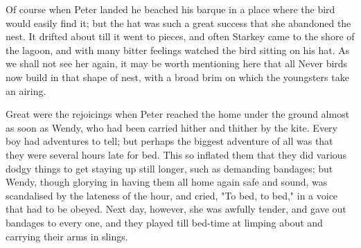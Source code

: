 Of course when Peter landed he beached his barque in a place where the bird would easily find it;
but the hat was such a great success that she abandoned the nest.
It drifted about till it went to pieces,
and often Starkey came to the shore of the lagoon,
and with many bitter feelings watched the bird sitting on his hat.
As we shall not see her again,
it may be worth mentioning here that all Never birds now build in that shape of nest,
with a broad brim on which the youngsters take an airing.

Great were the rejoicings when Peter reached the home under the ground almost as soon as Wendy,
who had been carried hither and thither by the kite.
Every boy had adventures to tell;
but perhaps the biggest adventure of all was that they were several hours late for bed.
This so inflated them that they did various dodgy things to get staying up still longer,
such as demanding bandages;
but Wendy, though glorying in having them all home again safe and sound,
was scandalised by the lateness of the hour,
and cried, "To bed, to bed," in a voice that had to be obeyed.
Next day, however, she was awfully tender,
and gave out bandages to every one,
and they played till bed-time at limping about and carrying their arms in slings.

\endinput
